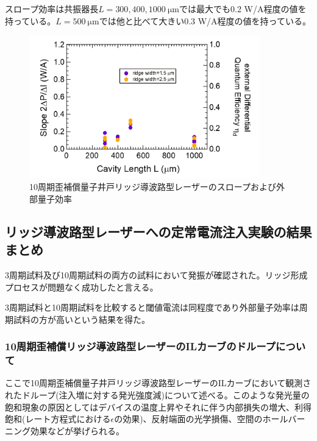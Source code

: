 {スロープ効率は共振器長$L=300, 400, 1000\ \si{\micro\metre}$では最大でも0.2 W/A程度の値を持っている。$L=500\ \si{\micro\metre}$では他と比べて大きい0.3 W/A程度の値を持っている。




\begin{figure}[ht]
	\centering
	\includegraphics[width=10cm]{figure/fig_3_2_10QW_ridge_slope.png}
		\caption{10周期歪補償量子井戸リッジ導波路型レーザーのスロープおよび外部量子効率}
		\label{fig:fig_3_2_10QW_ridge_slope}
\end{figure}

\subsection{リッジ導波路型レーザーへの定常電流注入実験の結果まとめ}
3周期試料及び10周期試料の両方の試料において発振が確認された。リッジ形成プロセスが問題なく成功したと言える。

3周期試料と10周期試料を比較すると閾値電流は同程度であり外部量子効率は周期試料の方が高いという結果を得た。

\subsubsection{10周期歪補償リッジ導波路型レーザーのILカーブのドループについて}
ここで10周期歪補償量子井戸リッジ導波路型レーザーのILカーブにおいて観測されたドループ(注入増に対する発光強度減)について述べる。このような発光量の飽和現象の原因としてはデバイスの温度上昇やそれに伴う内部損失の増大、利得飽和(レート方程式における$\epsilon$の効果)、反射端面の光学損傷、空間のホールバーニング効果などが挙げられる。


}
